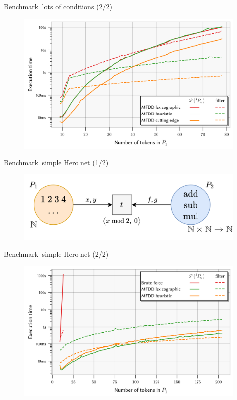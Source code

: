 \documentclass[10pt]{beamer}
\begin{document}
\begin{frame}[fragile]{Benchmark: lots of conditions (2/2)}
    \begin{figure}
        \centering
        \includegraphics[width=1.0\textwidth]{benchlotsc.png}
    \end{figure}
\end{frame}

\begin{frame}[fragile]{Benchmark: simple Hero net (1/2)}
    \begin{figure}
        \centering
        \includegraphics[width=1.0\textwidth]{brute.png}
    \end{figure}
\end{frame}

\begin{frame}[fragile]{Benchmark: simple Hero net (2/2)}
    \begin{figure}
        \centering
        \includegraphics[width=1.0\textwidth]{benchbrute.png}
    \end{figure}
\end{frame}
\end{document}
